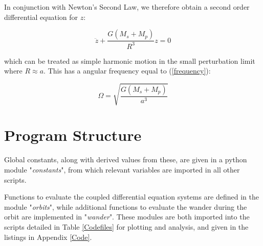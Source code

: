 \documentclass[11pt, a4paper,twocolumn]{article} %
\begin{document}
\begin{appendices}
In conjunction with Newton's Second Law, we therefore obtain a second order differential equation for $z$:

\begin{equation}
\ddot{z} + \frac{G (M_{s} + M_{p})}{R^{3}} z = 0
\end{equation}
	 
which can be treated as simple harmonic motion in the small perturbation limit where $R \approx a$. This has a angular frequency equal to (\ref{frequency}):

\begin{equation}
\Omega = \sqrt{\frac{G (M_{s} + M_{p})}{a^{3}}}
\end{equation}

\section{Program Structure} \label{structure}
Global constants, along with derived values from these, are given in a python module "\textit{constants}", from which relevant variables are imported in all other scripts.

Functions to evaluate the coupled differential equation systems are defined in the module "\textit{orbits}", while additional functions to evaluate the wander during the orbit are implemented in "\textit{wander}". These modules are both imported into the scripts detailed in Table \ref{Codefiles} for plotting and analysis, and given in the listings in Appendix \ref{Code}.






\onecolumn
\clearpage


\end{appendices}
\end{document}
